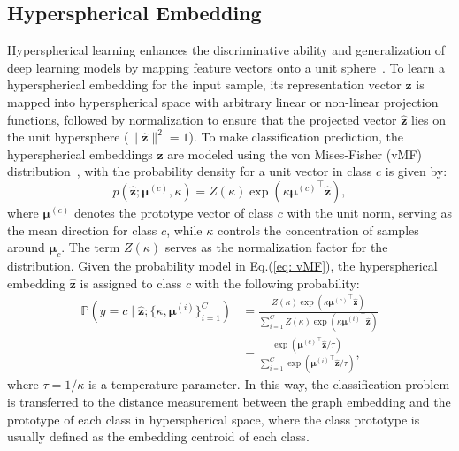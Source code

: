 \subsection{Hyperspherical Embedding} 
Hyperspherical learning enhances the discriminative ability and generalization of deep learning models by mapping feature vectors onto a unit sphere~\citep{liu2017deep}. 
To learn a hyperspherical embedding for the input sample, its representation vector $\mathbf{z}$ is mapped into hyperspherical space with arbitrary linear or non-linear projection functions, followed by normalization to ensure that the projected vector $\hat{\mathbf{z}}$ lies on the unit hypersphere ($\|\hat{\mathbf{z}}\|^{2}=1$). 
To make classification prediction, the hyperspherical embeddings $\hat{\mathbf{z}}$ are modeled using the von Mises-Fisher (vMF) distribution~\citep{ming2022exploit}, with the probability density for a unit vector in class $c$ is given by:
\begin{equation}
\label{eq: vMF} p(\hat{\mathbf{z}}; \boldsymbol{\mu}^{(c)}, \kappa ) = Z(\kappa) \exp(\kappa {\boldsymbol{\mu}^{(c)}}^\top \hat{\mathbf{z}}), 
\end{equation} 
where $\boldsymbol{\mu}^{(c)}$ denotes the prototype vector of class $c$ with the unit norm, serving as the mean direction for class $c$, while $\kappa$ controls the concentration of samples around $\boldsymbol{\mu}_c$.
The term $Z(\kappa)$ serves as the normalization factor for the distribution. Given the probability model in Eq.(\ref{eq: vMF}), the hyperspherical embedding $\hat{\mathbf{z}}$ is assigned to class $c$ with the following probability:
\begin{equation} \label{eq: prototpye_1}
    \begin{aligned}
\mathbb{P}\left(y = c \mid \hat{\mathbf{z}}; \{\kappa, \boldsymbol{\mu}^{(i)}\}_{i = 1}^{C}\right) &= \frac{Z(\kappa) \exp \left(\kappa {\boldsymbol{\mu}^{(c)}}^{\top} \hat{\mathbf{z}}\right)}{\sum_{i = 1}^{C} Z(\kappa) \exp \left(\kappa {\boldsymbol{\mu}^{(i)}}^{\top} \hat{\mathbf{z}}\right)}\\ &= \frac{\exp \left({\boldsymbol{\mu}^{(c)}}^{\top} \hat{\mathbf{z}} / \tau\right)}{\sum_{i = 1}^{C} \exp \left({\boldsymbol{\mu}^{(i)}}^{\top} \hat{\mathbf{z}}/ \tau\right)},
    \end{aligned}
\end{equation}
where $\tau = 1/\kappa$ is a temperature parameter. In this way, the classification problem is transferred to the distance measurement between the graph embedding and the prototype of each class in hyperspherical space, where the class prototype is usually defined as the embedding centroid of each class.